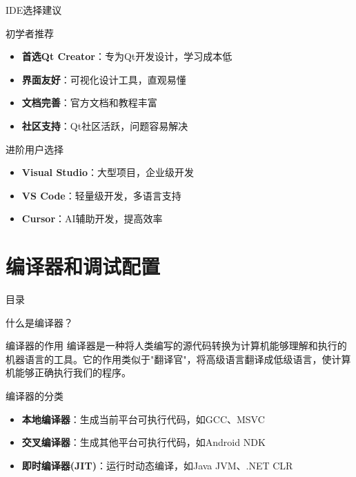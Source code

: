 \documentclass[UTF8,aspectratio=169]{beamer}
\begin{document}
\begin{frame}{IDE选择建议}
    \begin{ytublock}{初学者推荐}
        \begin{itemize}
            \item \textbf{首选Qt Creator}：专为Qt开发设计，学习成本低
            \item \textbf{界面友好}：可视化设计工具，直观易懂
            \item \textbf{文档完善}：官方文档和教程丰富
            \item \textbf{社区支持}：Qt社区活跃，问题容易解决
        \end{itemize}
    \end{ytublock}

    \begin{ytublock}{进阶用户选择}
        \begin{itemize}
            \item \textbf{Visual Studio}：大型项目，企业级开发
            \item \textbf{VS Code}：轻量级开发，多语言支持
            \item \textbf{Cursor}：AI辅助开发，提高效率
        \end{itemize}
    \end{ytublock}
\end{frame}

\section{编译器和调试配置}
\begin{frame}{目录}
    \begin{multicols}{2}
        \tableofcontents[currentsection]
    \end{multicols}
\end{frame}

\begin{frame}{什么是编译器？}
    \begin{ytublock}{编译器的作用}
        编译器是一种将人类编写的源代码转换为计算机能够理解和执行的机器语言的工具。它的作用类似于"翻译官"，将高级语言翻译成低级语言，使计算机能够正确执行我们的程序。
    \end{ytublock}

    \begin{ytublock}{编译器的分类}
        \begin{itemize}
            \item \textbf{本地编译器}：生成当前平台可执行代码，如GCC、MSVC
            \item \textbf{交叉编译器}：生成其他平台可执行代码，如Android NDK
            \item \textbf{即时编译器(JIT)}：运行时动态编译，如Java JVM、.NET CLR
        \end{itemize}
    \end{ytublock}
\end{frame}
\end{document}
